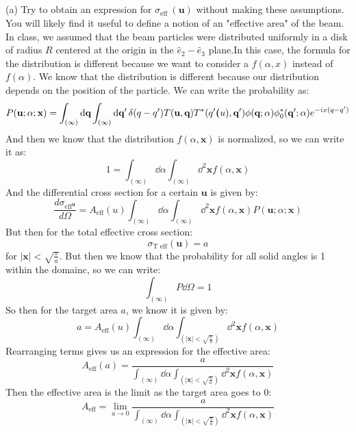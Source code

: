 \documentclass[12pt]{article}
\begin{document}
\subsection{}
(a) Try to obtain an expression for $\sigma_{\text {eff }}(\mathbf{u})$ without making these assumptions. You will likely find it useful to define a notion of an "effective area" of the beam.\\
In class, we assumed that the beam particles were distributed uniformly in a disk of radius $R$ centered at the origin in the $\hat{e}_{2}-\hat{e}_{3}$ plane.In this case, the formula for the distribution is different because we want to consider a $f(\alpha , x)$ instead of $f(\alpha )$. We know that the distribution is different because our distribution depends on the position of the particle. We can write the probability as:
\begin{equation}
P(\textbf{u} ; \alpha ; \mathbf{x}) = \int_{(\infty)} \dd{\textbf{q}}\int_{(\infty)} \dd{\textbf{q}^{\prime}} \delta(q-q^{\prime}) T(\textbf{u}   , \textbf{q})T^*(q^{\prime}\textbf(u), \textbf{q}^{\prime}) \phi(\textbf{q}; \alpha) \phi_0^*(\textbf{q}^{\prime}; \alpha) e^{-ix(q-q^{\prime})}
\end{equation}
And then we know that the distribution $f(\alpha, \textbf{x})$ is normalized, so we can write it as:
\begin{equation}
1 = \int_{(\infty)} \dd{\alpha} \int_{(\infty)} \dd^2{\textbf{x}} f(\alpha, \textbf{x})
\end{equation}
And the differential cross section for a certain $\textbf{u}$ is given by:
\begin{equation}
\frac{d\sigma_{\text{eff}^{\textbf{u}}}}{d\Omega} = A_{\text{eff}}(u) \int_{(\infty)} \dd{\alpha} \int_{(\infty)} \dd^2{\textbf{x}} f(\alpha, \textbf{x}) P(\textbf{u} ; \alpha ; \mathbf{x})
\end{equation}
But then for the total effective cross section:
\begin{equation}
\sigma_{\text{T eff}}(\textbf{u}) = a
\end{equation}
for $|\textbf{x}| < \sqrt{\frac{\pi}{a}}$. But then we know that the probability for all solid angles is 1 within the domainc, so we can write:
\begin{equation}
\int_{(\infty)} P \dd{\Omega} = 1
\end{equation}
So then for the target area $a$, we know it is given by:
\begin{equation}
a = A_{\text{eff}}(u) \int_{(\infty)} \dd{\alpha} \int_{(|\textbf{x}| < \sqrt{\frac{\pi}{a}})} \dd^2{\textbf{x}} f(\alpha, \textbf{x})
\end{equation}
Rearranging terms gives us an expression for the effective area:
\begin{equation}
A_{\text{eff}}(a) = \frac{a}{\int_{(\infty)} \dd{\alpha} \int_{(|\textbf{x}| < \sqrt{\frac{\pi}{a}})} \dd^2{\textbf{x}} f(\alpha, \textbf{x})}
\end{equation}
Then the effective area is the limit as the target area goes to 0:
\begin{equation}
A_{\text{eff}} = \lim_{a \to 0} \frac{a}{\int_{(\infty)} \dd{\alpha} \int_{(|\textbf{x}| < \sqrt{\frac{\pi}{a}})} \dd^2{\textbf{x}} f(\alpha, \textbf{x})}
\end{equation}
\end{document}
